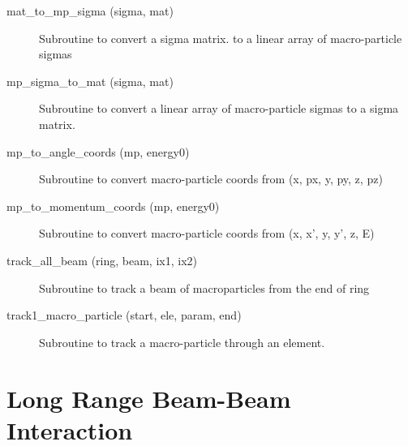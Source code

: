 \begin{description}

\item[mat\_to\_mp\_sigma (sigma, mat)] \Newline 
     Subroutine to convert a sigma matrix. to a linear array of 
     macro-particle sigmas 

\item[mp\_sigma\_to\_mat (sigma, mat)] \Newline 
     Subroutine to convert a linear array of macro-particle sigmas to a 
     sigma matrix. 

\item[mp\_to\_angle\_coords (mp, energy0)] \Newline 
     Subroutine to convert macro-particle coords from 
         (x, px, y, py, z, pz)

\item[mp\_to\_momentum\_coords (mp, energy0)] \Newline 
     Subroutine to convert macro-particle coords from 
         (x, x', y, y', z, E)

\item[track\_all\_beam (ring, beam, ix1, ix2)] \Newline 
     Subroutine to track a beam of macroparticles from the end of
     ring%

\item[track1\_macro\_particle (start, ele, param, end)] \Newline 
     Subroutine to track a macro-particle through an element.

\end{description}

\section{Long Range Beam-Beam Interaction}
\label{r:lrbbi}    

